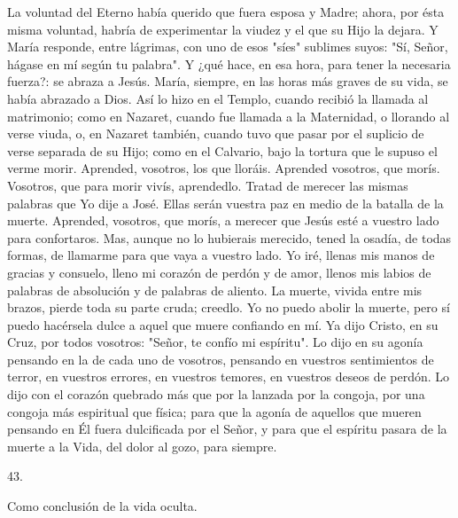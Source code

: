\documentclass[12pt]{book} %
\begin{document}
La voluntad del Eterno había querido que fuera esposa y Madre; ahora, por ésta misma voluntad, habría de 
experimentar la viudez y el que su Hijo la dejara. Y María responde, entre lágrimas, con uno de esos "síes" sublimes suyos: "Sí, Señor, hágase en mí según tu palabra". Y ¿qué hace, en esa hora, para tener la necesaria fuerza?: se abraza a Jesús. 
María, siempre, en las horas más graves de su vida, se había abrazado a Dios. Así lo hizo en el Templo, cuando recibió la 
llamada al matrimonio; como en Nazaret, cuando fue llamada a la Maternidad, o llorando al verse viuda, o, en Nazaret también, cuando tuvo que pasar por el suplicio de verse separada de su Hijo; como en el Calvario, bajo la tortura que le supuso el verme morir. 
Aprended, vosotros, los que lloráis. Aprended vosotros, que morís. Vosotros, que para morir vivís, aprendedlo. Tratad de merecer las mismas palabras que Yo dije a José. Ellas serán vuestra paz en medio de la batalla de la muerte. Aprended, vosotros, que morís, a merecer que Jesús esté a vuestro lado para confortaros. Mas, aunque no lo hubierais merecido, tened la osadía, de todas formas, de llamarme para que vaya a vuestro lado. Yo iré, llenas mis manos de gracias y consuelo, lleno mi corazón de perdón y de amor, llenos mis labios de palabras de absolución y de palabras de aliento. 
La muerte, vivida entre mis brazos, pierde toda su parte cruda; creedlo. Yo no puedo abolir la muerte, pero sí puedo hacérsela dulce a aquel que muere confiando en mí. 
Ya dijo Cristo, en su Cruz, por todos vosotros: "Señor, te confío mi espíritu". Lo dijo en su agonía pensando en la de cada 
uno de vosotros, pensando en vuestros sentimientos de terror, en vuestros errores, en vuestros temores, en vuestros deseos de perdón. Lo dijo con el corazón quebrado más que por la lanzada por la congoja, por una congoja más espiritual que física; para que la agonía de aquellos que mueren pensando en Él fuera dulcificada por el Señor, y para que el espíritu pasara de la muerte a la Vida, del dolor al gozo, para siempre. 
 
 
43. 
 
Como conclusión de la vida oculta. 
 
\end{document}
